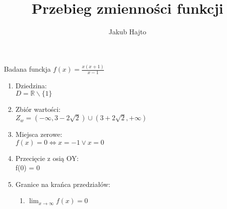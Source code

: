 \documentclass[11pt]{scrartcl}
\title{Przebieg zmienności funkcji}
\author{Jakub Hajto}
\begin{document}
	\maketitle
	\begin{center}
	Badana funckja $ f(x) = \frac{x(x+1)}{x-1} $
	\end{center}
	\begin{enumerate}  
		\item Dziedzina: \\
			$ D = \mathbb{R} \backslash \{1\} $
		\item Zbiór wartości: \\
			$ Z_w = (-\infty, 3 - 2\sqrt{2}) \cup (3 + 2\sqrt{2}, + \infty) $
		\item Miejsca zerowe: \\
			$ f(x) = 0 \Longleftrightarrow x = -1 \vee x = 0 $
		\item Przecięcie z osią OY: \\
			f(0) = 0
		\item Granice na krańca przedziałów:
			\begin{enumerate}
				\item $ \lim_{x\to\infty} f(x) = 0 $
			\end{enumerate}
			
	\end{enumerate}
	
\end{document}
